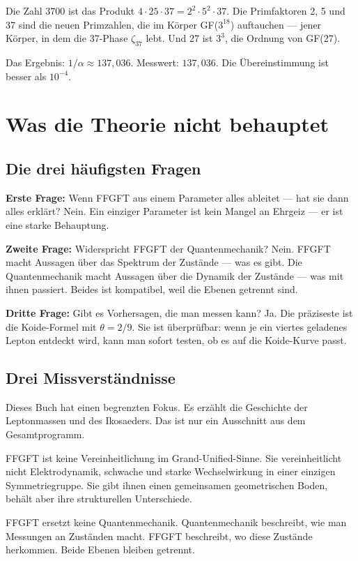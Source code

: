 \documentclass[12pt,oneside]{book}
\begin{document}
Die Zahl 3700 ist das Produkt $4 \cdot 25 \cdot 37 = 2^2 \cdot 5^2 \cdot 37$. Die Primfaktoren 2, 5 und 37 sind die neuen Primzahlen, die im Körper GF($3^{18}$) auftauchen — jener Körper, in dem die 37-Phase $\zeta_{37}$ lebt. Und 27 ist $3^3$, die Ordnung von GF(27).

Das Ergebnis: $1/\alpha \approx 137{,}036$. Messwert: $137{,}036$. Die Übereinstimmung ist besser als $10^{-4}$.

\chapter{Was die Theorie nicht behauptet}

\section{Die drei häufigsten Fragen}

\textbf{Erste Frage:} Wenn FFGFT aus einem Parameter alles ableitet — hat sie dann alles erklärt? Nein. Ein einziger Parameter ist kein Mangel an Ehrgeiz — er ist eine starke Behauptung.

\textbf{Zweite Frage:} Widerspricht FFGFT der Quantenmechanik? Nein. FFGFT macht Aussagen über das Spektrum der Zustände — was es gibt. Die Quantenmechanik macht Aussagen über die Dynamik der Zustände — was mit ihnen passiert. Beides ist kompatibel, weil die Ebenen getrennt sind.

\textbf{Dritte Frage:} Gibt es Vorhersagen, die man messen kann? Ja. Die präziseste ist die Koide-Formel mit $\theta = 2/9$. Sie ist überprüfbar: wenn je ein viertes geladenes Lepton entdeckt wird, kann man sofort testen, ob es auf die Koide-Kurve passt.

\section{Drei Missverständnisse}

Dieses Buch hat einen begrenzten Fokus. Es erzählt die Geschichte der Leptonmassen und des Ikosaeders. Das ist nur ein Ausschnitt aus dem Gesamtprogramm.

FFGFT ist keine Vereinheitlichung im Grand-Unified-Sinne. Sie vereinheitlicht nicht Elektrodynamik, schwache und starke Wechselwirkung in einer einzigen Symmetriegruppe. Sie gibt ihnen einen gemeinsamen geometrischen Boden, behält aber ihre strukturellen Unterschiede.

FFGFT ersetzt keine Quantenmechanik. Quantenmechanik beschreibt, wie man Messungen an Zuständen macht. FFGFT beschreibt, wo diese Zustände herkommen. Beide Ebenen bleiben getrennt.
\end{document}

